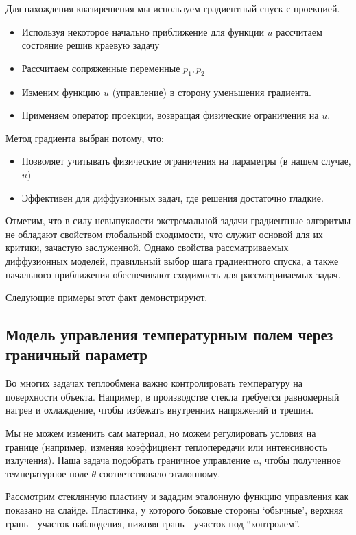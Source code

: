 \documentclass[8pt,a4paper]{article}
\begin{document}
    Для нахождения квазирешения мы используем градиентный спуск с проекцией.
    \begin{itemize}
        \item Используя некоторое начально приближение для функции $u$ рассчитаем состояние решив краевую задачу
        \item Рассчитаем сопряженные переменные $p_1, p_2$
        \item Изменим функцию $u$ (управление) в сторону уменьшения градиента.
        \item Применяем оператор проекции, возвращая физические ограничения на $u$.
    \end{itemize}

    Метод градиента выбран потому, что:
    \begin{itemize}
        \item Позволяет учитывать физические ограничения на параметры (в нашем случае, $u$)
        \item Эффективен для диффузионных задач, где решения достаточно гладкие.
    \end{itemize}


    Отметим, что в силу невыпуклости экстремальной задачи градиентные алгоритмы не обладают
    свойством глобальной сходимости, что служит основой для их критики, зачастую заслуженной.
    Однако свойства рассматриваемых диффузионных моделей,
    правильный выбор шага градиентного спуска, а также начального приближения
    обеспечивают сходимость для рассматриваемых задач.

    Следующие примеры этот факт демонстрируют.

    \subsection*{Модель управления температурным полем через граничный параметр}
    Во многих задачах теплообмена важно контролировать температуру на поверхности объекта.
    Например, в производстве стекла требуется равномерный нагрев и охлаждение,
    чтобы избежать внутренних напряжений и трещин.

    Мы не можем изменить сам материал, но можем регулировать условия на границе
    (например, изменяя коэффициент теплопередачи или интенсивность излучения).
    Наша задача подобрать граничное управление $u$,
    чтобы полученное температурное поле $\theta$ соответствовало эталонному.

    Рассмотрим стеклянную пластину и зададим эталонную функцию управления как показано на слайде.
    Пластинка, у которого боковые стороны `обычные', верхняя грань - участок наблюдения,
    нижняя грань - участок под ``контролем''.
\end{document}
